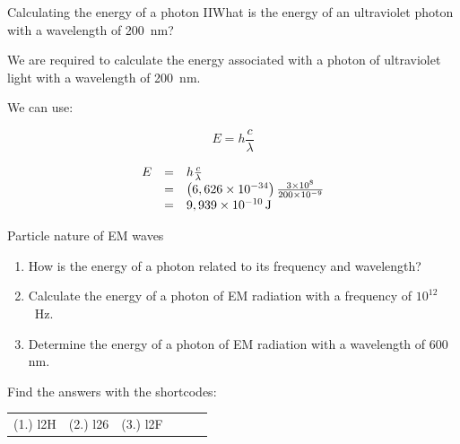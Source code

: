   \begin{wex}{Calculating the energy of a photon II}{What is the energy of an ultraviolet photon with a wavelength of 200~nm?}{
      \label{m38778*id189184}We are required to calculate the energy associated with a photon of ultraviolet light with a wavelength of 200~nm.\par 
      \label{m38778*id189190}We can use:\par 
      \label{m38778*id189193}\nopagebreak\noindent{}
        
    \begin{equation}
    E=h\frac{c}{\lambda }
      \end{equation}
      \label{m38778*id189220}\nopagebreak\noindent{}
    
    \begin{equation}
    \begin{array}{ccc}\hfill E& =& h\frac{c}{\lambda }\hfill \\ & =& \left(6,626\ensuremath{\times}{10}^{-34}\right)\frac{3\ensuremath{\times}{10}^{8}}{200\ensuremath{\times}{10}^{-9}}\hfill \\ & =& 9,939\ensuremath{\times}{10}^{-10}\phantom{\rule{0.166667em}{0ex}}\mathrm{J}\hfill \end{array}
      \end{equation}}
         \end{wex}
      \label{m38778*uid13}
            \begin{exercises}{Particle nature of EM waves}
            \nopagebreak
        \label{m38778*id189384}\begin{enumerate}[noitemsep, label=\textbf{\arabic*}. ] 
            \label{m38778*uid14}\item How is the energy of a photon related to its frequency and wavelength?\newline
\label{m38778*uid15}\item Calculate the energy of a photon of EM radiation with a frequency of ${10}^{12}$~Hz.\newline
\label{m38778*uid16}\item Determine the energy of a photon of EM radiation with a wavelength of 600 nm.\newline
\end{enumerate}
  \label{m38778**end}
\par {} Find the answers with the shortcodes:
 \par \begin{tabular}[h]{cccccc}
 (1.) l2H  &  (2.) l26  &  (3.) l2F  & \end{tabular}
\end{exercises}
            
